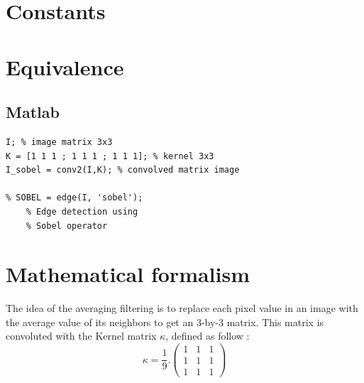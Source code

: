 \documentclass[12pt,a4paper]{article}
\begin{document}
\vspace{1.5cm}

\section*{Constants}


\vspace{1.5cm}

\section*{Equivalence}
\subsection*{Matlab}

\lstset{language=Matlab}
\begin{lstlisting}
I; % image matrix 3x3
K = [1 1 1 ; 1 1 1 ; 1 1 1]; % kernel 3x3
I_sobel = conv2(I,K); % convolved matrix image 

% SOBEL = edge(I, 'sobel'); 
	% Edge detection using 
	% Sobel operator

\end{lstlisting}

\vspace{1.5cm}

\section*{Mathematical formalism}


The idea of the averaging filtering is to replace each pixel value in an image with the average value of its neighbors to get an 3-by-3 matrix. This matrix is convoluted with the Kernel matrix $\kappa$, defined as follow : \\ 

\begin{equation}\label{eq1}
\kappa = \frac{1}{9} . \begin{pmatrix}
1 & 1 & 1 \\ 
1 & 1 & 1 \\ 
1 & 1 & 1
\end{pmatrix}
\end{equation}
\end{document}
